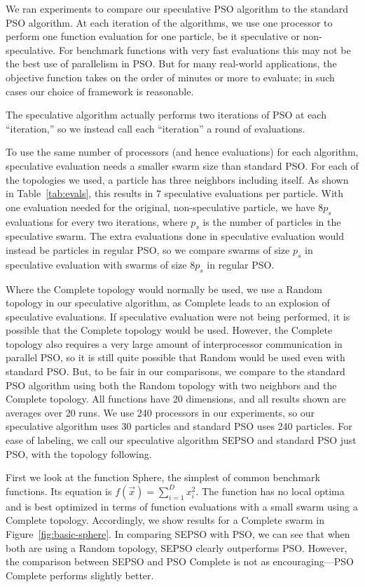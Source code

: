 \documentclass[journal,letterpaper]{IEEEtran}
\newcommand{\fig}[1]{Figure~\ref{fig:#1}}
\begin{document}
We ran experiments to compare our speculative PSO algorithm to the standard PSO
algorithm.  At each iteration of the algorithms, we use one processor to
perform one function evaluation for one particle, be it speculative or
non-speculative.  For benchmark functions with very fast evaluations this may
not be the best use of parallelism in PSO.  But for many real-world
applications, the objective function takes on the order of minutes or more to
evaluate; in such cases our choice of framework is reasonable.

The speculative algorithm actually performs two iterations of PSO at each
``iteration,'' so we instead call each ``iteration'' a round of evaluations.

To use the same number of processors (and hence evaluations) for each
algorithm, speculative evaluation needs a smaller swarm size than standard PSO.
For each of the topologies we used, a particle has three neighbors including
itself.  As shown in Table~\ref{tab:evals}, this results in $7$ speculative
evaluations per particle.  With one evaluation needed for the original,
non-speculative particle, we have $8p_s$ evaluations for every two iterations,
where $p_s$ is the number of particles in the speculative swarm.  The extra
evaluations done in speculative evaluation would instead be particles in
regular PSO, so we compare swarms of size $p_s$ in speculative evaluation with
swarms of size $8p_s$ in regular PSO.

Where the Complete topology would normally be used, we use a Random topology in
our speculative algorithm, as Complete leads to an explosion of speculative
evaluations.  If speculative evaluation were not being performed, it is
possible that the Complete topology would be used.  However, the Complete
topology also requires a very large amount of interprocessor communication in
parallel PSO, so it is still quite possible that Random would be used even with
standard PSO.  But, to be fair in our comparisons, we compare to the standard
PSO algorithm using both the Random topology with two neighbors and the
Complete topology.  All functions have 20 dimensions, and all results shown are
averages over 20 runs.  We use 240 processors in our experiments, so our
speculative algorithm uses 30 particles and standard PSO uses 240 particles.
For ease of labeling, we call our speculative algorithm SEPSO and standard PSO
just PSO, with the topology following.

First we look at the function Sphere, the simplest of common benchmark
functions.  Its equation is $f(\Vec{x}) = \sum_{i=1}^D x_i^2$.  The function
has no local optima and is best optimized in terms of function evaluations with
a small swarm using a Complete topology.  Accordingly, we show results for a
Complete swarm in \fig{basic-sphere}.  In comparing SEPSO with PSO, we can see
that when both are using a Random topology, SEPSO clearly outperforms PSO.
However, the comparison between SEPSO and PSO Complete is not as
encouraging---PSO Complete performs slightly better.
\end{document}
